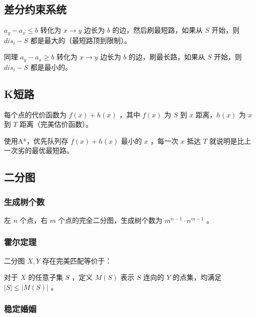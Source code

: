 \subsection{差分约束系统}

$a_y-a_x\le b$ 转化为 $x\to y$ 边长为 $b$ 的边，然后刷最短路，如果从 $S$ 开始，则 $dis_i-S$ 都是最大的（最短路顶到限制）。

同理 $a_y-a_x\ge b$ 转化为 $x\to y$ 边长为 $b$ 的边，刷最长路，如果从 $S$ 开始，则 $dis_i-S$ 都是最小的。

\vspace{-0.2cm}

\subsection{K短路}

每个点的代价函数为 $f(x)+h(x)$ ，其中 $f(x)$ 为 $S$ 到 $x$ 距离，$h(x)$ 为 $x$ 到 $T$ 距离（完美估价函数）。

使用A*，优先队列存 $f(x)+h(x)$ 最小的 $x$ ，每一次 $x$ 抵达 $T$ 就说明是比上一次劣的最优最短路。


\vspace{-0.2cm}

\subsection{二分图}

\subsubsection{生成树个数}

左 $n$ 个点，右 $m$ 个点的完全二分图，生成树个数为 $m^{n-1}\cdot n^{m-1}$ 。

\vspace{-0.2cm}

\subsubsection{霍尔定理}

二分图 $X,Y$ 存在完美匹配等价于：

对于 $X$ 的任意子集 $S$ ，定义 $M(S)$ 表示 $S$ 连向的 $Y$ 的点集，均满足 $|S|\le |M(S)|$ 。

\vspace{-0.2cm}

\subsubsection{稳定婚姻}

